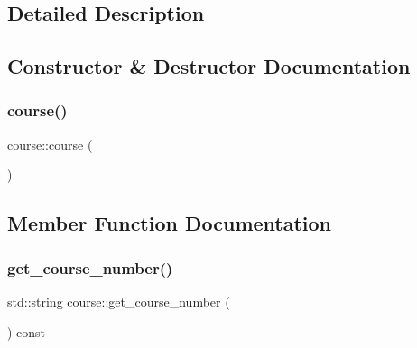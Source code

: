 \subsection{Detailed Description}

\begin{DoxyCodeInclude}

\end{DoxyCodeInclude}
 
\begin{DoxyCodeInclude}
\end{DoxyCodeInclude}
 

\subsection{Constructor \& Destructor Documentation}
\hypertarget{classcourse_a56fe8c0b1c3a9022eee53e8557c16629}{}\label{classcourse_a56fe8c0b1c3a9022eee53e8557c16629} 
\subsubsection{\texorpdfstring{course()}{course()}}
{\footnotesize\ttfamily course\+::course (\begin{DoxyParamCaption}{ }\end{DoxyParamCaption})}



\subsection{Member Function Documentation}
\hypertarget{classcourse_a8b2f74ab01eae52d779979887fc3b079}{}\label{classcourse_a8b2f74ab01eae52d779979887fc3b079} 
\subsubsection{\texorpdfstring{get\+\_\+course\+\_\+number()}{get\_course\_number()}}
{\footnotesize\ttfamily std\+::string course\+::get\+\_\+course\+\_\+number (\begin{DoxyParamCaption}{ }\end{DoxyParamCaption}) const\hspace{0.3cm}{\ttfamily [inline]}}

\hypertarget{classcourse_a5008b6a7c44047fefa1c7779b771aad4}{}\label{classcourse_a5008b6a7c44047fefa1c7779b771aad4} 
